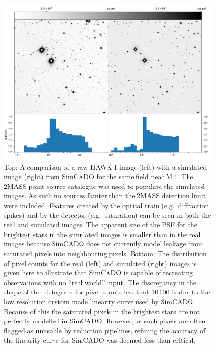 \begin{figure}

    \centering
    \includegraphics[width=\textwidth]{images/HAWKI_vs_HAWKado_images_quarter}
    
    \caption{Top: A comparison of a raw HAWK-I image (left) with a simulated image (right) from SimCADO for the same field near M\,4.
    The 2MASS point source catalogue was used to populate the simulated images.
    As such no sources fainter than the 2MASS detection limit were included. 
    Features created by the optical train (e.g.~diffraction spikes) and by the detector (e.g.~saturation) can be seen in both the real and simulated images.
    The apparent size of the PSF for the brightest stars in the simulated images is smaller than in the real images because SimCADO does not currently model leakage from saturated pixels into neighbouring pixels. 
    Bottom: The distribution of pixel counts for the real (left) and simulated (right) images is given here to illustrate that SimCADO is capable of recreating observations with no ``real world'' input. 
    The discrepancy in the shape of the histogram for pixel counts less that 10\,000 is due to the low resolution custom made linearity curve used by SimCADO. 
    Because of this the saturated pixels in the brightest stars are not perfectly modelled in SimCADO. 
    However, as such pixels are often flagged as unusable by reduction pipelines, refining the accuracy of the linearity curve for SimCADO was deemed less than critical.}
    \label{fig:img_comparison}
    
\end{figure}


